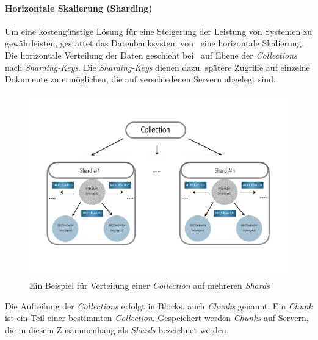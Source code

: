 \paragraph{Horizontale Skalierung (Sharding)}\label{sharding}

Um eine kostengünstige Lösung für eine Steigerung der Leistung von Systemen zu gewährleisten, gestattet das Datenbanksystem von \mongo\ eine horizontale Skalierung. Die horizontale Verteilung der Daten geschieht bei \mongo\ auf Ebene der \textit{Collections} nach \textit{Sharding-Keys}. Die \textit{Sharding-Keys} dienen dazu, spätere Zugriffe auf einzelne Dokumente zu ermöglichen, die auf verschiedenen Servern abgelegt sind.
\begin{figure}[H]
\centering
\includegraphics[trim = 0mm 35mm 0mm 30mm, clip, width=1.0\textwidth]{resources/replicaSet/sharding}
\caption[Ein Beispiel für Verteilung einer \textit{Collection} auf mehreren \textit{Shards}]{Ein Beispiel für Verteilung einer \textit{Collection} auf mehreren \textit{Shards}}
\label{img:sharding}
\end{figure}
Die Aufteilung der \textit{Collections} erfolgt in Blocks, auch \textit{Chunks} genannt. Ein \textit{Chunk} ist ein Teil einer bestimmten \textit{Collection}. Gespeichert werden \textit{Chunks} auf Servern, die in diesem Zusammenhang als \textit{Shards} bezeichnet werden.

